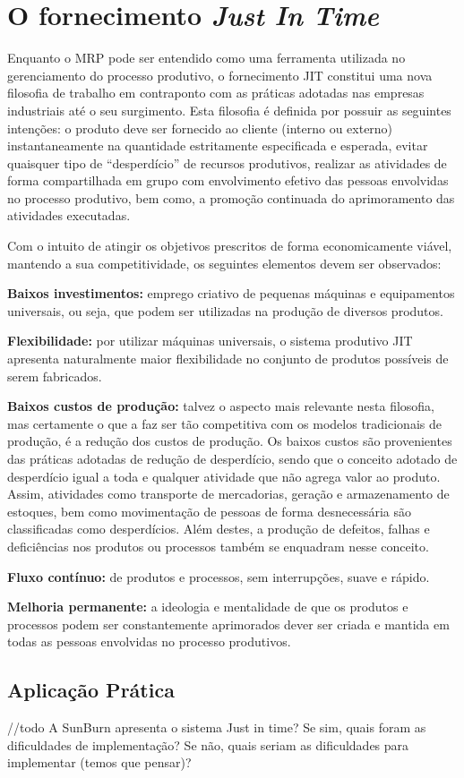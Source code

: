 \chapter{O fornecimento \textit{Just In Time}}
\label{chap:fornecimento_just_in_time}

Enquanto o \ac{MRP} pode ser entendido como uma ferramenta utilizada no gerenciamento do processo produtivo, o fornecimento \ac{JIT} constitui uma nova filosofia de trabalho em contraponto com as práticas adotadas nas empresas industriais até o seu surgimento. Esta filosofia é definida por possuir as seguintes intenções: o produto deve ser fornecido ao cliente (interno ou externo) instantaneamente na quantidade estritamente especificada e esperada, evitar quaisquer tipo de ``desperdício'' de recursos produtivos, realizar as atividades de forma compartilhada em grupo com envolvimento efetivo das pessoas envolvidas no processo produtivo, bem como, a promoção continuada do aprimoramento das atividades executadas.

Com o intuito de atingir os objetivos prescritos de forma economicamente viável, mantendo a sua competitividade, os seguintes elementos devem ser observados:

\textbf{Baixos investimentos:} emprego criativo de pequenas máquinas e equipamentos universais, ou seja, que podem ser utilizadas na produção de diversos produtos.

\textbf{Flexibilidade:} por utilizar máquinas universais, o sistema produtivo \ac{JIT} apresenta naturalmente maior flexibilidade no conjunto de produtos possíveis de serem fabricados.

\textbf{Baixos custos de produção:} talvez o aspecto mais relevante nesta filosofia, mas certamente o que a faz ser tão competitiva com os modelos tradicionais de produção, é a redução dos custos de produção. Os baixos custos são provenientes das práticas adotadas de redução de desperdício, sendo que o conceito adotado de desperdício igual a toda e qualquer atividade que não agrega valor ao produto. Assim, atividades como transporte de mercadorias, geração e armazenamento de estoques, bem como movimentação de pessoas de forma desnecessária são classificadas como desperdícios. Além destes, a produção de defeitos, falhas e deficiências nos produtos ou processos também se enquadram nesse conceito.

\textbf{Fluxo contínuo:} de produtos e processos, sem interrupções, suave e rápido.

\textbf{Melhoria permanente:} a ideologia e mentalidade de que os produtos e processos podem ser constantemente aprimorados dever ser criada e mantida em todas as pessoas envolvidas no processo produtivos.

\section{Aplicação Prática}
\label{sec:fonercimento_just_in_time_aplicacao}

//todo A SunBurn apresenta o sistema Just in time? Se sim, quais foram as dificuldades de implementação? Se não, quais seriam as dificuldades para implementar (temos que pensar)? 
